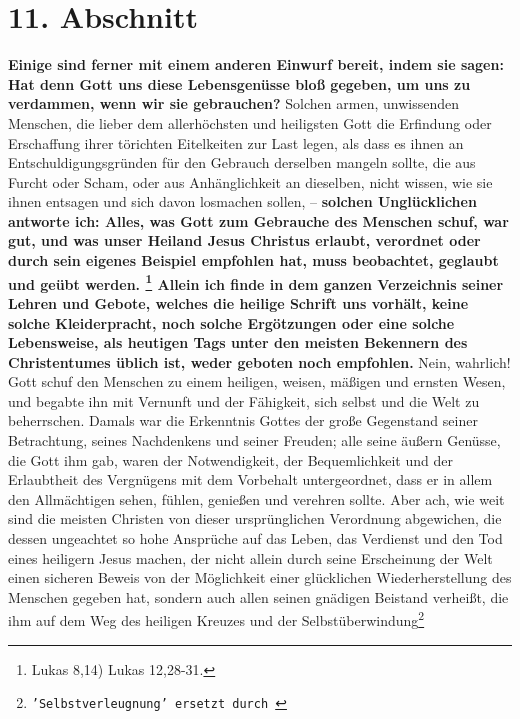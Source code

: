 {\section{11. Abschnitt} \label{kap17_ab11}

\label{ref:17_11_einwand_2} \textbf{Einige sind ferner mit einem anderen
Einwurf
bereit, indem sie sagen:
Hat denn
Gott uns diese Lebensgenüsse bloß gegeben, um uns zu verdammen, wenn wir sie
gebrauchen?} Solchen armen, unwissenden Menschen, die lieber dem allerhöchsten
und heiligsten Gott die Erfindung oder Erschaffung ihrer törichten Eitelkeiten
zur Last legen, als dass es ihnen an Entschuldigungsgründen für den Gebrauch
derselben mangeln sollte, die aus Furcht oder Scham, oder aus Anhänglichkeit an
dieselben, nicht wissen, wie sie ihnen entsagen und sich davon losmachen sollen,
-- \label{ref:17_11_beteubung}\textbf{solchen Unglücklichen antworte ich: Alles,
was Gott zum Gebrauche
des
Menschen schuf, war gut, und was unser Heiland Jesus Christus erlaubt,
verordnet oder durch sein eigenes Beispiel empfohlen hat, muss beobachtet,
geglaubt und geübt werden. \footnote{Lukas 8,14)
Lukas 12,28-31.}
Allein ich
finde in dem ganzen Verzeichnis seiner Lehren und Gebote, welches die heilige
Schrift uns vorhält, keine solche Kleiderpracht, noch solche Ergötzungen oder
eine solche Lebensweise, als heutigen Tags unter den meisten Bekennern des
Christentumes üblich ist, weder geboten noch empfohlen.} Nein, wahrlich! Gott
schuf den Menschen zu einem heiligen, weisen, mäßigen und ernsten Wesen, und
begabte ihn mit Vernunft und der Fähigkeit, sich selbst und die Welt zu
beherrschen.
Damals war die Erkenntnis Gottes der große Gegenstand seiner Betrachtung, seines
Nachdenkens und seiner Freuden; alle seine äußern Genüsse, die Gott ihm gab,
waren der Notwendigkeit, der Bequemlichkeit und der Erlaubtheit des Vergnügens
mit dem Vorbehalt untergeordnet, dass er in allem den Allmächtigen sehen,
fühlen, genießen und verehren sollte. Aber ach, wie weit sind die meisten
Christen von dieser ursprünglichen Verordnung abgewichen, die dessen ungeachtet
so hohe Ansprüche auf das Leben, das Verdienst und den Tod eines heiligern Jesus
machen, der nicht allein durch seine Erscheinung der Welt einen sicheren Beweis
von der Möglichkeit einer glücklichen Wiederherstellung des Menschen gegeben
hat, sondern auch allen seinen gnädigen Beistand verheißt, die ihm auf dem Weg
des heiligen Kreuzes und der
Selbstüberwindung\footnote{\texttt{'Selbstverleugnung' ersetzt durch
}}}
